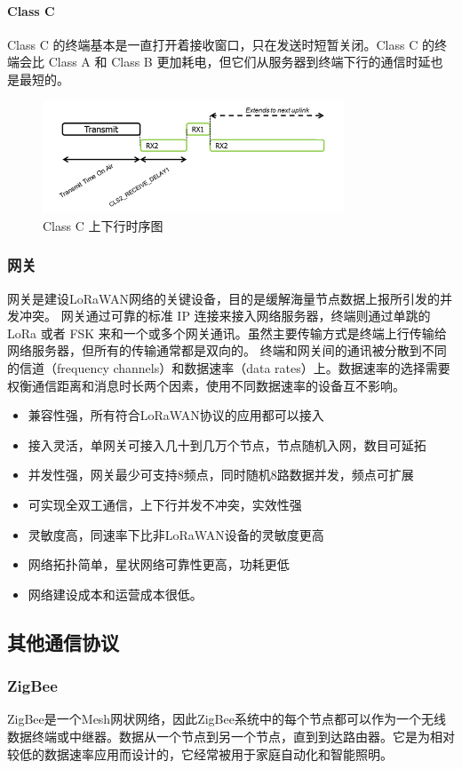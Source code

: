 \documentclass[scheme=chinese,a4paper]{article}
\begin{document}
\paragraph{Class C}
Class C 的终端基本是一直打开着接收窗口，只在发送时短暂关闭。Class C 的终端会比 Class A 和 Class B 更加耗电，但它们从服务器到终端下行的通信时延也是最短的。
\begin{figure}[H]
\centering
\includegraphics[width=0.8\textwidth]{class_c.png}
\caption{Class C 上下行时序图}
\end{figure}

\subsubsection{网关}
网关是建设LoRaWAN网络的关键设备，目的是缓解海量节点数据上报所引发的并发冲突。
网关通过可靠的标准 IP 连接来接入网络服务器，终端则通过单跳的 LoRa 或者 FSK 来和一个或多个网关通讯。虽然主要传输方式是终端上行传输给网络服务器，但所有的传输通常都是双向的。
终端和网关间的通讯被分散到不同的信道（frequency channels）和数据速率（data rates）上。数据速率的选择需要权衡通信距离和消息时长两个因素，使用不同数据速率的设备互不影响。
\begin{itemize}
  \item 兼容性强，所有符合LoRaWAN协议的应用都可以接入
  \item 接入灵活，单网关可接入几十到几万个节点，节点随机入网，数目可延拓
  \item 并发性强，网关最少可支持8频点，同时随机8路数据并发，频点可扩展
  \item 可实现全双工通信，上下行并发不冲突，实效性强
  \item 灵敏度高，同速率下比非LoRaWAN设备的灵敏度更高
  \item 网络拓扑简单，星状网络可靠性更高，功耗更低
  \item 网络建设成本和运营成本很低。
\end{itemize}
\subsection{其他通信协议}
\subsubsection{ZigBee}
ZigBee是一个Mesh网状网络，因此ZigBee系统中的每个节点都可以作为一个无线数据终端或中继器。数据从一个节点到另一个节点，直到到达路由器。它是为相对较低的数据速率应用而设计的，它经常被用于家庭自动化和智能照明。
\end{document}
